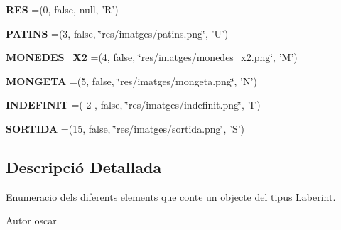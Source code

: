 \begin{DoxyCompactItemize}
\item 
\hypertarget{enumlogica_1_1enumeracions_1_1_e_element_a245e97fd082485340269d8ab61f2b755}{{\bfseries R\+E\+S} =(0, false, null, 'R')}\label{enumlogica_1_1enumeracions_1_1_e_element_a245e97fd082485340269d8ab61f2b755}

\item 
\hypertarget{enumlogica_1_1enumeracions_1_1_e_element_a0a61c21bfec5ae8800427056310419e3}{{\bfseries P\+A\+T\+I\+N\+S} =(3, false, \char`\"{}res/imatges/patins.\+png\char`\"{}, 'U')}\label{enumlogica_1_1enumeracions_1_1_e_element_a0a61c21bfec5ae8800427056310419e3}

\item 
\hypertarget{enumlogica_1_1enumeracions_1_1_e_element_a46992bac48ae51860eab0c0943396e3c}{{\bfseries M\+O\+N\+E\+D\+E\+S\+\_\+\+X2} =(4, false, \char`\"{}res/imatges/monedes\+\_\+x2.\+png\char`\"{}, 'M')}\label{enumlogica_1_1enumeracions_1_1_e_element_a46992bac48ae51860eab0c0943396e3c}

\item 
\hypertarget{enumlogica_1_1enumeracions_1_1_e_element_a1ecb0f7c24daddf0c76a31d6011d88aa}{{\bfseries M\+O\+N\+G\+E\+T\+A} =(5, false, \char`\"{}res/imatges/mongeta.\+png\char`\"{}, 'N')}\label{enumlogica_1_1enumeracions_1_1_e_element_a1ecb0f7c24daddf0c76a31d6011d88aa}

\item 
\hypertarget{enumlogica_1_1enumeracions_1_1_e_element_a662e4647d191a9df383e40bb61c5eb91}{{\bfseries I\+N\+D\+E\+F\+I\+N\+I\+T} =(-\/2 , false, \char`\"{}res/imatges/indefinit.\+png\char`\"{}, 'I')}\label{enumlogica_1_1enumeracions_1_1_e_element_a662e4647d191a9df383e40bb61c5eb91}

\item 
\hypertarget{enumlogica_1_1enumeracions_1_1_e_element_ae8aea2c8afbe63876761224cc6db55be}{{\bfseries S\+O\+R\+T\+I\+D\+A} =(15, false, \char`\"{}res/imatges/sortida.\+png\char`\"{}, 'S')}\label{enumlogica_1_1enumeracions_1_1_e_element_ae8aea2c8afbe63876761224cc6db55be}

\end{DoxyCompactItemize}


\subsection{Descripció Detallada}
Enumeracio dels diferents elements que conte un objecte del tipus Laberint. 

\begin{DoxyAuthor}{Autor}
oscar 
\end{DoxyAuthor}


